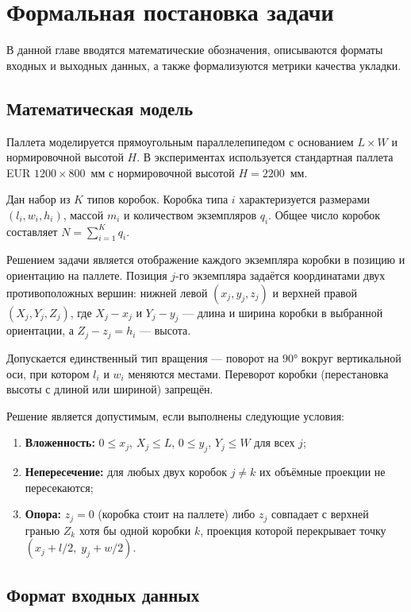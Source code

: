 \chapter{Формальная постановка задачи}
\label{cha:Formal}

В данной главе вводятся математические обозначения, описываются форматы входных и выходных данных, а также формализуются метрики качества укладки.

\section{Математическая модель}

Паллета моделируется прямоугольным параллелепипедом с основанием $L \times W$ и нормировочной высотой $H$. В экспериментах используется стандартная паллета EUR $1200 \times 800$~мм с нормировочной высотой $H = 2200$~мм.

Дан набор из $K$ типов коробок. Коробка типа $i$ характеризуется размерами $(l_i, w_i, h_i)$, массой $m_i$ и количеством экземпляров $q_i$. Общее число коробок составляет $N = \sum_{i=1}^{K} q_i$.

Решением задачи является отображение каждого экземпляра коробки в позицию и ориентацию на паллете. Позиция $j$-го экземпляра задаётся координатами двух противоположных вершин: нижней левой $(x_j, y_j, z_j)$ и верхней правой $(X_j, Y_j, Z_j)$, где $X_j - x_j$ и $Y_j - y_j$ --- длина и ширина коробки в выбранной ориентации, а $Z_j - z_j = h_i$ --- высота.

Допускается единственный тип вращения --- поворот на $90°$ вокруг вертикальной оси, при котором $l_i$ и $w_i$ меняются местами. Переворот коробки (перестановка высоты с длиной или шириной) запрещён.

Решение является допустимым, если выполнены следующие условия:
\begin{enumerate}
  \item \textbf{Вложенность:} $0 \leq x_j$, $X_j \leq L$, $0 \leq y_j$, $Y_j \leq W$ для всех $j$;
  \item \textbf{Непересечение:} для любых двух коробок $j \neq k$ их объёмные проекции не пересекаются;
  \item \textbf{Опора:} $z_j = 0$ (коробка стоит на паллете) либо $z_j$ совпадает с верхней гранью $Z_k$ хотя бы одной коробки $k$, проекция которой перекрывает точку $(x_j + l/2,\; y_j + w/2)$.
\end{enumerate}

\section{Формат входных данных}
\label{sec:input_format}

